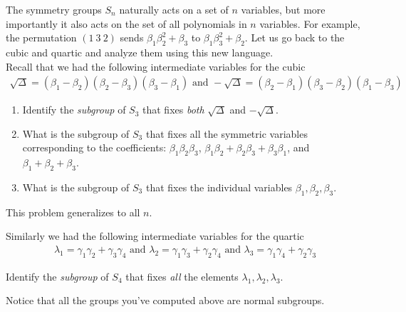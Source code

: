 The symmetry groups $ S_n$ naturally acts on a set of $ n$ variables, but more importantly it also acts on the set of all polynomials in $ n$ variables. For example, the permutation $ (1 \: 3 \: 2)$ sends $ \beta_1 \beta_2^2 +  \beta_3 $ to $ \beta_1 \beta_3^2 +  \beta_2 $. Let us go back to the cubic and quartic and analyze them using this new language.\\


Recall that we had the following intermediate variables for the cubic
  \begin{align*}
    \sqrt{\Delta} = (\beta_1 -\beta_2)(\beta_2 - \beta_3)(\beta_3 - \beta_1) \mbox{ and } -\sqrt{\Delta} = (\beta_2 -\beta_1)(\beta_3 - \beta_2)(\beta_1 - \beta_3)
  \end{align*}

\begin{questions}[resume]
  \item \begin{enumerate}
  \label{ques:cubic}
    \item Identify the \emph{subgroup} of $ S_3$ that fixes \emph{both} $\sqrt{\Delta} $ and $-\sqrt{\Delta}$.
    \item What is the subgroup of $ S_3$ that fixes all the symmetric variables corresponding to the coefficients: $ \beta_1 \beta_2 \beta_3$, $\beta_1 \beta_2 + \beta_2 \beta_3 + \beta_3 \beta_1$, and $\beta_1 + \beta_2 + \beta_3$.
    \item What is the subgroup of $ S_3$ that fixes the individual variables $\beta_1 , \beta_2,  \beta_3 $.
  \end{enumerate}
  This problem generalizes to all $ n$.
\end{questions}

Similarly we had the following intermediate variables for the quartic
  \begin{align*}
    \lambda_1 = \gamma_1 \gamma_2 + \gamma_3 \gamma_4 
    \mbox{ and } \lambda_2 = \gamma_1 \gamma_3 + \gamma_2 \gamma_4
    \mbox{ and } \lambda_3 = \gamma_1 \gamma_4 + \gamma_2 \gamma_3 
  \end{align*}

\begin{questions}[resume]
  \item 
  \label{ques:quartic}
Identify the \emph{subgroup} of $ S_4$ that fixes \emph{all} the elements $ \lambda_1, \lambda_2, \lambda_3$. 
\end{questions}

Notice that all the groups you've computed above are normal subgroups. 


